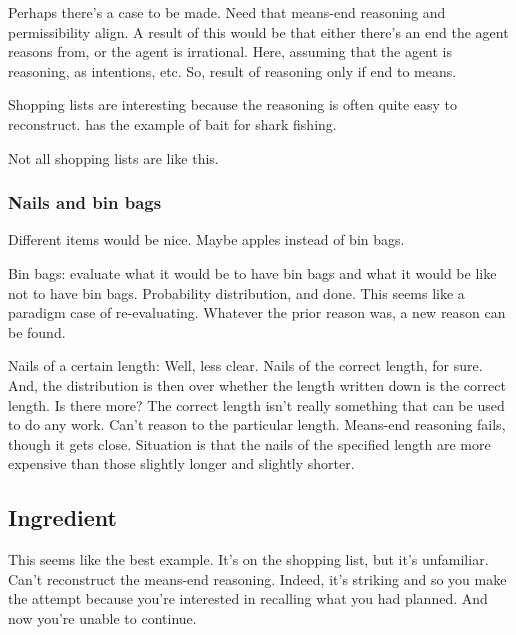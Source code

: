 \documentclass[10pt]{article}
\begin{document}
Perhaps there's a case to be made.
Need that means-end reasoning and permissibility align.
A result of this would be that either there's an end the agent reasons from, or the agent is irrational.
Here, assuming that the agent is reasoning, as intentions, etc.
So, result of reasoning only if end to means.

Shopping lists are interesting because the reasoning is often quite easy to reconstruct.
\citeauthor{Anscombe:1957aa} has the example of bait for shark fishing.

Not all shopping lists are like this.


\subsubsection{Nails and bin bags}
\label{sec:nails-bin-bags}

{\color{red}
  Different items would be nice.
  Maybe apples instead of bin bags.
}

Bin bags: evaluate what it would be to have bin bags and what it would be like not to have bin bags.
Probability distribution, and done.
This seems like a paradigm case of re-evaluating.
Whatever the prior reason was, a new reason can be found.

Nails of a certain length:
Well, less clear.
Nails of the correct length, for sure.
And, the distribution is then over whether the length written down is the correct length.
Is there more?
The correct length isn't really something that can be used to do any work.
Can't reason to the particular length.
Means-end reasoning fails, though it gets close.
Situation is that the nails of the specified length are more expensive than those slightly longer and slightly shorter.


\subsection{Ingredient}
\label{sec:ingredient}

This seems like the best example.
It's on the shopping list, but it's unfamiliar.
Can't reconstruct the means-end reasoning.
Indeed, it's striking and so you make the attempt because you're interested in recalling what you had planned.
And now you're unable to continue.


\newpage

\printbibliography
\end{document}
